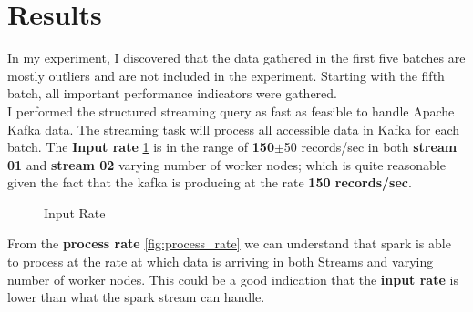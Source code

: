 \documentclass[12pt,a4paper]{report}
\begin{document}
\section{Results}
In my experiment, I discovered that the data gathered in the first five batches are mostly outliers and are not included in the experiment. Starting with the fifth batch, all important performance indicators were gathered. \\

I performed the structured streaming query as fast as feasible to handle Apache Kafka data. The streaming task will process all accessible data in Kafka for each batch. The \textbf{Input rate} \ref{fig:input_rate} is in the range of \textbf{150}$\pm$50 records/sec in both \textbf{stream 01} and \textbf{stream 02} varying number of worker nodes; which is quite reasonable given the fact that the kafka is producing at the rate \textbf{150 records/sec}.\\


\begin{figure}[h!]%
    \centering
    \qquad
    \caption{Input Rate}%
    \label{fig:input_rate}%
\end{figure}


From the \textbf{process rate} \ref{fig:process_rate} we can understand that spark is able to process at the rate at which data is arriving in both Streams and varying number of worker nodes. This could be a good indication that the \textbf{input rate} is lower than what the spark stream can handle.
\end{document}
